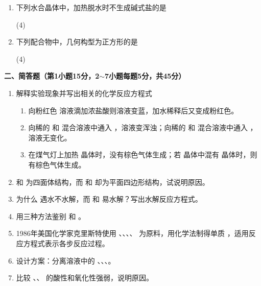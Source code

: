 \begin{enumerate}[label=\arabic*., itemsep=1.5ex]
    \item 下列水合晶体中，加热脱水时不生成碱式盐的是
    \begin{tasks}(4)
        \task {}
        \task {}
        \task {}
        \task {}
    \end{tasks}

    \item 下列配合物中，几何构型为正方形的是
    \begin{tasks}(4)
        \task {}
        \task {}
        \task \ce{[AuCl4]-}
        \task \ce{[Ni(CO)4]}
    \end{tasks}
\end{enumerate}

\vspace{0.5cm}
\noindent\textbf{二、简答题（第1小题15分，2\(\sim\)7小题每题5分，共45分）}

\begin{enumerate}[label=\arabic*., itemsep=1.5ex]
    \item 解释实验现象并写出相关的化学反应方程式
    \begin{enumerate}[label=(\arabic*), noitemsep, topsep=0pt, partopsep=0pt]
        \item 向粉红色  溶液滴加浓盐酸则溶液变蓝，加水稀释后又变成粉红色。
        \item 向稀的  和  混合溶液中通入 ，溶液变浑浊；向稀的  和  混合溶液中通入 ，溶液无变化。
        \item 在煤气灯上加热  晶体时，没有棕色气体生成；若  晶体中混有  晶体时，则有棕色气体生成。
    \end{enumerate}

    \item {} 和  为四面体结构，而  和  却为平面四边形结构，试说明原因。

    \item 为什么  遇水不水解，而  和  易水解？写出水解反应方程式。

    \item 用三种方法鉴别  和 。

    \item 1986年美国化学家克里斯特使用 、、、、 为原料，用化学法制得单质 ，适用反应方程式表示各步反应过程。

    \item 设计方案：分离溶液中的 、、、。

    \item 比较 、、 的酸性和氧化性强弱，说明原因。
\end{enumerate}

